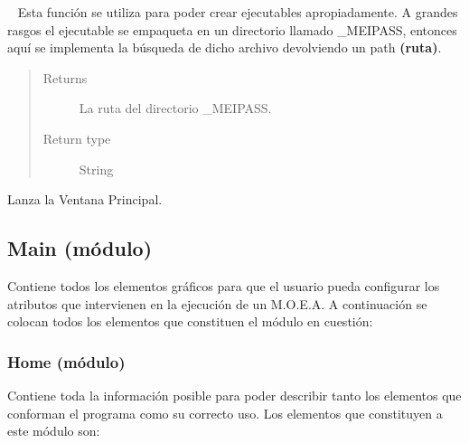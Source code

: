 \documentclass[class=report, crop=false]{standalone}
\begin{document}
\begin{fulllineitems}
\begin{fulllineitems}
\end{fulllineitems}

\begin{fulllineitems}

~
\vspace{-0.1cm}
Esta función se utiliza para poder crear ejecutables
apropiadamente.\break
A grandes rasgos el ejecutable se empaqueta en un directorio
llamado \_MEIPASS, entonces aquí se implementa la búsqueda
de dicho archivo devolviendo un path \textbf{(ruta)}.

\begin{quote}\begin{description}
\item[{Returns}] \leavevmode
La ruta del directorio \_MEIPASS.
\item[{Return type}] \leavevmode
String
\end{description}\end{quote}

\end{fulllineitems}

\begin{fulllineitems}

Lanza la Ventana Principal.

\end{fulllineitems}

\end{fulllineitems}

\subsection{Main (módulo)}
\label{sec:a_3_2}
Contiene todos los elementos gráficos para que el usuario
pueda configurar los atributos que intervienen en la ejecución 
de un M.O.E.A.\medskip\break
A continuación se colocan todos los elementos que constituen el 
módulo en cuestión:

\subsubsection{Home (módulo)}
\label{sec:a_3_2_1}
Contiene toda la información posible para poder describir tanto 
los elementos que conforman el programa como su correcto uso.\medskip\break
Los elementos que constituyen a este módulo son:
\end{document}
